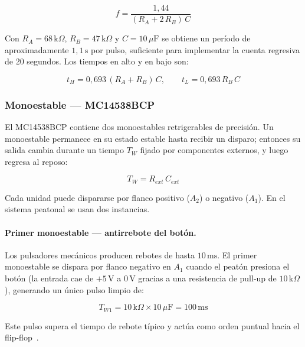 \documentclass[journal]{IEEEtran}
\begin{document}
\begin{equation}
    f = \frac{1{,}44}{(R_A + 2\,R_B)\,C}
    \label{eq:555_freq}
\end{equation}

Con $R_A = 68\,\text{k}\Omega$, $R_B = 47\,\text{k}\Omega$ y $C = 10\,\mu\text{F}$
se obtiene un período de aproximadamente $1{,}1\,\text{s}$ por pulso, suficiente para
implementar la cuenta regresiva de 20 segundos. Los tiempos en alto y en bajo son:

\begin{equation}
    t_H = 0{,}693\,(R_A + R_B)\,C, \qquad t_L = 0{,}693\,R_B\,C
    \label{eq:555_tiempos}
\end{equation}

\subsubsection{Monoestable — MC14538BCP}

El MC14538BCP contiene dos monoestables retrigerables de precisión. Un monoestable
permanece en su estado estable hasta recibir un disparo; entonces su salida cambia
durante un tiempo $T_W$ fijado por componentes externos, y luego regresa al
reposo:

\begin{equation}
    T_W = R_{ext}\,C_{ext}
    \label{eq:mono}
\end{equation}

Cada unidad puede dispararse por flanco positivo ($A_2$) o negativo ($A_1$). En el
sistema peatonal se usan dos instancias.

\paragraph{Primer monoestable — antirrebote del botón.}
Los pulsadores mecánicos producen rebotes de hasta $10\,\text{ms}$. El primer
monoestable se dispara por flanco negativo en $A_1$ cuando el peatón presiona el botón
(la entrada cae de $+5\,\text{V}$ a $0\,\text{V}$ gracias a una resistencia de
pull-up de $10\,\text{k}\Omega$), generando un único pulso limpio de:

\begin{equation}
    T_{W1} = 10\,\text{k}\Omega \times 10\,\mu\text{F} = 100\,\text{ms}
    \label{eq:tw1}
\end{equation}

Este pulso supera el tiempo de rebote típico y actúa como orden puntual hacia el
flip-flop~\cite{Floyd2008}.
\end{document}
